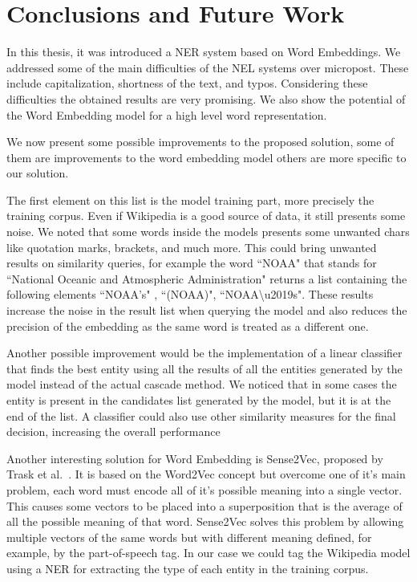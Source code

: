 \chapter{Conclusions and Future Work}


In this thesis, it was introduced a NER system based on Word Embeddings. We addressed some of the main difficulties of the NEL systems over micropost. These include capitalization, shortness of the text, and typos. Considering these difficulties the obtained results are very promising. We also show the potential of the Word Embedding model for a high level word representation.

We now present some possible improvements to the proposed solution, some of them are improvements to the word embedding model others are more specific to our solution.


The first element on this list is the model training part, more precisely the training corpus. Even if Wikipedia is a good source of data, it still presents some noise. We noted that some words inside the models presents some unwanted chars like quotation marks, brackets, and much more. This could bring unwanted results on similarity queries, for example the word ``NOAA"  that stands for ``National Oceanic and Atmospheric Administration" returns a list containing the following elements ``NOAA's" , ``(NOAA)",  \mbox{``NOAA\textbackslash u2019s"}. These results increase the noise in the result list when querying the model and also reduces the precision of the embedding as the same word is treated as a different one.


Another possible improvement would be the implementation of a linear classifier that finds the best entity using all the results of all the entities generated by the model instead of the actual cascade method. We noticed that in some cases the entity is present in the candidates list generated by the model, but it is at the end of the list. A classifier could also use other similarity measures for the final decision, increasing the overall performance


Another interesting solution for Word Embedding is Sense2Vec, proposed by Trask et al.~\cite{trask2015sense2vec}. It is based on the Word2Vec concept but overcome one of it's main problem, each word must encode all of it's possible meaning into a single vector. This causes some vectors to be placed into a superposition that is the average of all the possible meaning of that word. Sense2Vec solves this problem by allowing multiple vectors of the same words but with different meaning defined, for example, by the part-of-speech tag. In our case we could tag the Wikipedia model using a NER for extracting the type of each entity in the training corpus.

